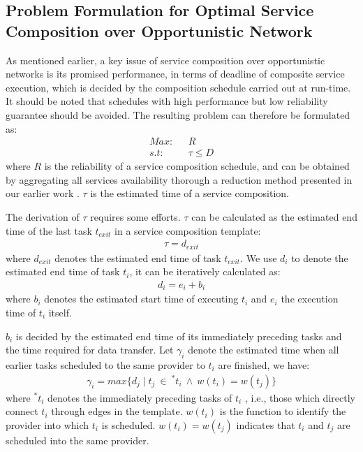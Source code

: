 \documentclass[journal]{IEEEtran}
\begin{document}
\subsection{Problem Formulation for Optimal Service Composition over Opportunistic Network}

As mentioned earlier, a key issue of service composition over opportunistic networks is its promised performance, in terms of deadline of composite service execution, which is decided by the composition schedule carried out at run-time. It should be noted that schedules with high performance but low reliability guarantee should be avoided. The resulting problem can therefore be formulated as:
\begin{align}
Max    : \ \ \ & R   \\\nonumber
s.t    : \ \ \ & \tau \le D
\end{align}
where $R$ is the reliability of a service composition schedule, and can be obtained by aggregating all services availability thorough a reduction method presented in our earlier work \cite{xia2009novel}. $\tau$ is the estimated time of a service composition. 

The derivation of $\tau$ requires some efforts. $\tau$ can be calculated as the estimated end time of the last task $t_{exit}$ in a service composition template:
\begin{align}
\tau = d_{exit}
\end{align}
where $d_{exit}$ denotes the estimated end time of task $t_{exit}$. We use $d_i$ to denote the estimated end time of task $t_i$, it can be iteratively calculated as:
\begin{align}
d_i = e_i + b_i
\end{align}
where $b_i$ denotes the estimated start time of executing $t_i$ and $e_i$ the execution time of $t_i$ itself.

$b_i$ is decided by the estimated end time of its immediately preceding tasks and the time required for data transfer. Let $\gamma_i$ denote the estimated time when all earlier tasks scheduled to the same provider to $t_i$ are finished, we have:
\begin{align}
\gamma_i =  max\{d_j \mid t_j \ \in \ ^{*}t_i \ \wedge \ w(t_i) = w(t_j) \}
\end{align}
where $^{*}t_i$ denotes the immediately preceding tasks of $t_i$ , i.e., those which directly connect $t_i$ through edges in the template. 
$w(t_i)$ is the function to identify the provider into which $t_i$ is scheduled. $w(t_i) = w(t_j)$ indicates that $t_i$ and $t_j$ are scheduled into the same provider.
\end{document}
